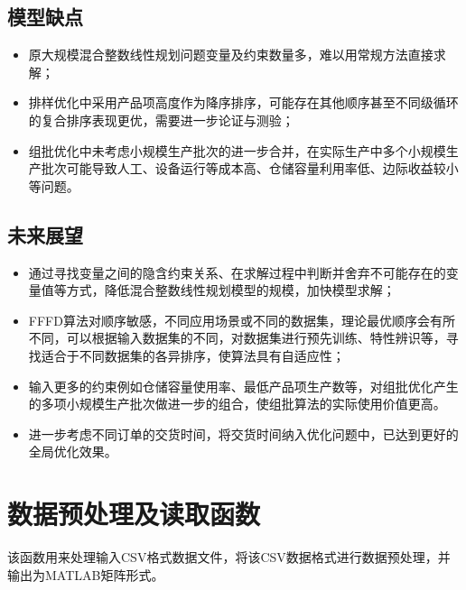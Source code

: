 \documentclass[bwprint]{gmcmthesis}
\begin{document}
\subsection{模型缺点}
\begin{itemize}
    \item 原大规模混合整数线性规划问题变量及约束数量多，难以用常规方法直接求解；
    \item 排样优化中采用产品项高度作为降序排序，可能存在其他顺序甚至不同级循环的复合排序表现更优，需要进一步论证与测验；
    \item 组批优化中未考虑小规模生产批次的进一步合并，在实际生产中多个小规模生产批次可能导致人工、设备运行等成本高、仓储容量利用率低、边际收益较小等问题。
\end{itemize}

\subsection{未来展望}
\begin{itemize}
	\item 通过寻找变量之间的隐含约束关系、在求解过程中判断并舍弃不可能存在的变量值等方式，降低混合整数线性规划模型的规模，加快模型求解；
	\item FFFD算法对顺序敏感，不同应用场景或不同的数据集，理论最优顺序会有所不同，可以根据输入数据集的不同，对数据集进行预先训练、特性辨识等，寻找适合于不同数据集的各异排序，使算法具有自适应性；
	\item 输入更多的约束例如仓储容量使用率、最低产品项生产数等，对组批优化产生的多项小规模生产批次做进一步的组合，使组批算法的实际使用价值更高。
	\item 进一步考虑不同订单的交货时间，将交货时间纳入优化问题中，已达到更好的全局优化效果。
\end{itemize}



\newpage
\quad
\newpage





\cite{mittelbach_latex_2004,wright_latex3_2009,beeton_unicode_2008,vieth_experiences_2009}

\newpage
\appendix
\newpage
\section{数据预处理及读取函数}\label{数据预处理及读取函数}
该函数用来处理输入CSV格式数据文件，将该CSV数据格式进行数据预处理，并输出为MATLAB矩阵形式。
\end{document}
